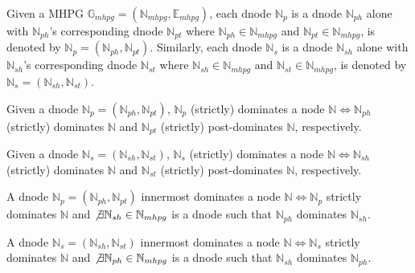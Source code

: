 Given a MHPG $\mathbb{G}_{mhpg} = (\mathbb{N}_{mhpg}, \mathbb{E}_{mhpg})$, each  dnode $\mathbb{N}_{p}$ is a  dnode $\mathbb{N}_{ph}$ alone with $\mathbb{N}_{ph}$'s corresponding  dnode $\mathbb{N}_{pt}$ where $\mathbb{N}_{ph} \in \mathbb{N}_{mhpg}$ and $\mathbb{N}_{pt} \in \mathbb{N}_{mhpg}$, is denoted by $\mathbb{N}_{p} = (\mathbb{N}_{ph}, \mathbb{N}_{pt})$. Similarly, each  dnode $\mathbb{N}_{s}$ is a  dnode $\mathbb{N}_{sh}$ alone with $\mathbb{N}_{sh}$'s corresponding  dnode $\mathbb{N}_{st}$ where $\mathbb{N}_{sh} \in \mathbb{N}_{mhpg}$ and $\mathbb{N}_{st} \in \mathbb{N}_{mhpg}$, is denoted by $\mathbb{N}_{s} = (\mathbb{N}_{sh}, \mathbb{N}_{st})$.

\begin{mydef}
Given a  dnode $\mathbb{N}_{p} = (\mathbb{N}_{ph}, \mathbb{N}_{pt})$, $\mathbb{N}_{p}$ (strictly) dominates a node $\mathbb{N} \iff \mathbb{N}_{ph}$ (strictly) dominates $\mathbb{N}$ and $\mathbb{N}_{pt}$ (strictly) post-dominates $\mathbb{N}$, respectively.
\end{mydef}

\begin{mydef}
Given a  dnode $\mathbb{N}_{s} = (\mathbb{N}_{sh}, \mathbb{N}_{st})$, $\mathbb{N}_{s}$ (strictly) dominates a node $\mathbb{N} \iff \mathbb{N}_{sh}$ (strictly) dominates $\mathbb{N}$ and $\mathbb{N}_{st}$ (strictly) post-dominates $\mathbb{N}$, respectively.
\end{mydef}

\begin{mydef}
A  dnode $\mathbb{N}_{p} = (\mathbb{N}_{ph}, \mathbb{N}_{pt})$ innermost dominates a node $\mathbb{N} \iff \mathbb{N}_{p}$ strictly dominates $\mathbb{N}$ and $\not\exists\mathbb{N}_{sh} \in \mathbb{N}_{mhpg}$ is a  dnode such that $\mathbb{N}_{ph}$ dominates $\mathbb{N}_{sh}$.
\end{mydef}

\begin{mydef}
A  dnode $\mathbb{N}_{s} = (\mathbb{N}_{sh}, \mathbb{N}_{st})$ innermost dominates a node $\mathbb{N} \iff \mathbb{N}_{s}$ strictly dominates $\mathbb{N}$ and $\not\exists\mathbb{N}_{ph} \in \mathbb{N}_{mhpg}$ is a  dnode such that $\mathbb{N}_{sh}$ dominates $\mathbb{N}_{ph}$.
\end{mydef}

